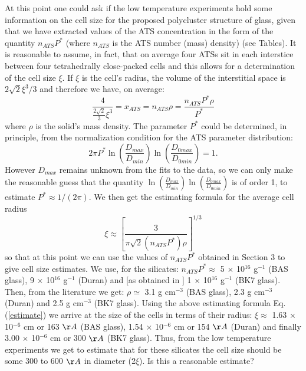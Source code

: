 \documentclass[10pt]{article}
\begin{document}
At this point one could ask if the low temperature experiments hold some information
on the cell size for the proposed polycluster structure of glass, given that we have 
extracted values of the ATS concentration in the form of the quantity $n_{ATS}P^*$
(where $n_{ATS}$ is the ATS number (mass) density) (see Tables). 
It is reasonable to assume, in fact, that on average four ATSs sit in each interstice 
between four tetrahedrally close-packed cells and this allows for a determination of 
the cell size $\xi$. If $\xi$ is the cell's radius, the volume of the interstitial space is 
$2\sqrt{2}\xi^3/3$ and therefore we have, on average:
\begin{equation}
\frac{4}{\frac{2\sqrt{2}}{3}\xi^3}=x_{ATS}=n_{ATS}\rho=\frac{n_{ATS}P^*\rho}{P^*}
\end{equation} 
where $\rho$ is the solid's mass density. The parameter $P^*$ could be determined, 
in principle, from the normalization condition for the ATS parameter distribution:
\begin{equation}
2\pi P^* \ln\left( \frac{D_{max}}{D_{min}} \right) 
\ln\left( \frac{D_{0max}}{D_{0min}} \right) =1. 
\end{equation}
However $D_{max}$ remains unknown from the fits to the data, so we can only 
make the reasonable guess that the quantity  
$\ln\left( \frac{D_{max}}{D_{min}} \right) \ln\left( \frac{D_{0max}}{D_{0min}} \right)$
is of order 1, to estimate $P^*\approx 1/(2\pi)$. We then get the estimating 
formula for the average cell radius
\begin{equation}
\xi\approx \left[ \frac{3}{\pi\sqrt{2}(n_{ATS}P^*)\rho} \right]^{1/3}
\label{estimate}
\end{equation}
so that at this point we can use the values of $n_{ATS}P^*$ obtained in Section 3
to give cell size estimates. We use, for the silicates:
$n_{ATS}P^*\approx$ 5 $\times$ 10$^{16}$ g$^{-1}$ (BAS glass),
9  $\times$ 10$^{16}$ g$^{-1}$ (Duran) and [as obtained in \cite{Bon2015}]
1 $\times$ 10$^{16}$ g$^{-1}$ (BK7 glass). Then, from the literature \cite{Sie2001}
we get: 
$\rho\simeq$ 3.1 g cm$^{-3}$ (BAS glass),
2.3 g cm$^{-3}$ (Duran) and
2.5 g cm$^{-3}$ (BK7 glass). Using the above estimating formula 
Eq. (\ref{estimate}) we arrive at the size of the cells in terms of their radius:
$\xi\approx$ 1.63 $\times$ 10$^{-6}$ cm or 163 $\AA$ (BAS glass),
1.54 $\times$ 10$^{-6}$ cm or 154 $\AA$ (Duran) and finally
3.00 $\times$ 10$^{-6}$ cm or 300 $\AA$ (BK7 glass). Thus, from the low
temperature experiments we get to estimate that for these silicates the cell size 
should be some 300 to 600 $\AA$ in diameter (2$\xi$). 
Is this a reasonable estimate?
\end{document}
